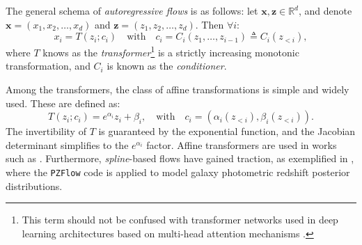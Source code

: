 \documentclass[fleqn,usenatbib]{mnras}
\begin{document}
The general schema of \textit{autoregressive flows} is as follows: let $\bm{x}, \bm{z} \in \mathbb{R}^d$, and denote $\bm{x} = (x_1, x_2, \dots, x_d)$ and $\bm{z} = (z_1, z_2, \dots, z_d)$. Then $\forall i$:
\begin{equation}
x_i = T(z_i; c_i) \quad \mathrm{with} \quad c_i = C_i(z_1, \dots, z_{i-1}) \triangleq C_i(z_{<i}),
\end{equation}
{\color{red}where $T$ knows as the \textit{transformer}\footnote{This term should not be confused with transformer networks used in deep learning architectures based on multi-head attention mechanisms \citep{Vaswani2017}.} is a strictly increasing monotonic transformation, and $C_i$ is known as the \textit{conditioner}.}


{\color{red} Among the transformers, the class of affine transformations is simple and widely used.} These are defined as:
\begin{equation}
T(z_i; c_i) = e^{\alpha_i} z_i + \beta_i, \quad \mathrm{with} \quad c_i = (\alpha_i(z_{<i}), \beta_i(z_{<i})).
\label{eq-affine-coupling}
\end{equation}
The invertibility of $T$ is guaranteed by the exponential function, and the Jacobian determinant simplifies to the $e^{\alpha_i}$ factor. Affine transformers are used in works such as \citep{DinhKB14, Papamakarios2017a, DinhSB17, Kingma2018}. 
Furthermore, \textit{spline}-based flows have gained traction, as exemplified in \cite{Crenshaw_2024}, where the \texttt{PZFlow} code is applied to model galaxy photometric redshift posterior distributions.
\end{document}
